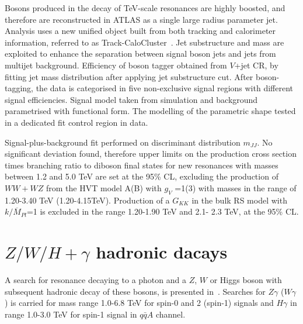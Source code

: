 \documentclass{PoS}
\begin{document}
Bosons produced in the decay of TeV-scale resonances are highly boosted, and therefore are reconstructed in ATLAS as a single large radius parameter jet. 
Analysis uses a new unified object built from both tracking and calorimeter information, referred to as Track-CaloCluster~\cite{ATL-PHYS-PUB-2017-015}. 
Jet substructure and mass are exploited to enhance the separation between signal boson jets and jets from multijet background. 
Efficiency of boson tagger obtained from $V$+jet CR, by fitting jet mass distribution after applying jet substructure cut. %
After boson-tagging, the data is categorised in five non-exclusive signal regions with different signal efficiencies.
Signal model taken from simulation and background parametrised with functional form. The modelling of the parametric shape tested in a dedicated fit control region in data.

Signal-plus-background fit performed on discriminant distribution $m_{JJ}$.
No significant deviation found, therefore upper limits on the production cross section times branching ratio to diboson final states for new resonances with masses between 1.2 and 5.0 TeV are set at the 95\% CL, excluding the production of $WW+WZ$ from the HVT model A(B) with $g_V$ =1(3) with masses in the range of 1.20-3.40 TeV (1.20-4.15TeV). 
Production of a $G_{KK}$ in the bulk RS model with $k/\overline{M}_{Pl}$=1 is excluded in the range 1.20-1.90 TeV and 2.1- 2.3 TeV, at the 95\% CL.

\section{$Z/W/H+\gamma$ hadronic dacays}
\label{sec:gV}
A search for resonance decaying to a photon and a $Z$, $W$ or Higgs boson with subsequent hadronic decay of these bosons, is presented in~\cite{EXOT-2016-30}. Searches for $Z\gamma$ ($W\gamma$) is carried for mass range 1.0-6.8 TeV for spin-0 and 2 (spin-1) signals and $H\gamma$ in range 1.0-3.0 TeV for spin-1 signal in $q\bar{q}A$ channel.
\end{document}
